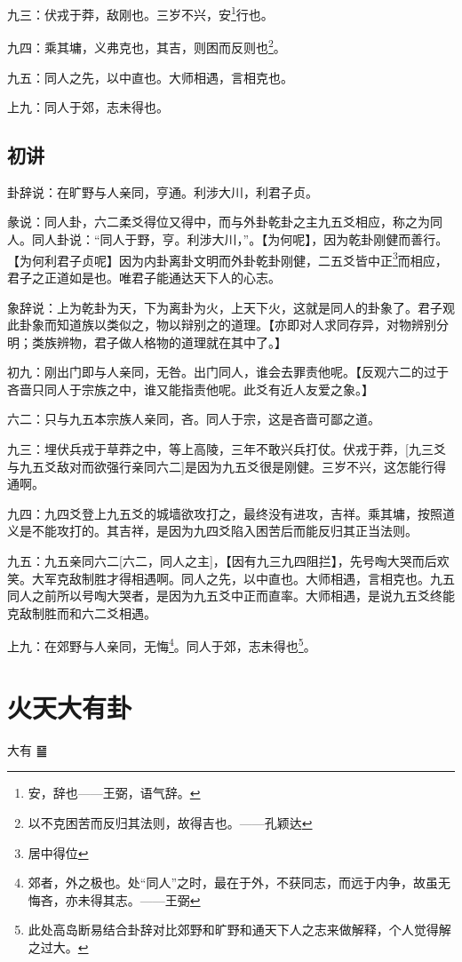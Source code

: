 \documentclass[12pt,oneside]{book}
\begin{document}
九三：伏戎于莽，敌刚也。三岁不兴，安\footnote{安，辞也——王弼，语气辞。}行也。

九四：乘其墉，义弗克也，其吉，则困而反则也\footnote{以不克困苦而反归其法则，故得吉也。——孔颖达}。

九五：同人之先，以中直也。大师相遇，言相克也。

上九：同人于郊，志未得也。

\section{初讲}
卦辞说：在旷野与人亲同，亨通。利涉大川，利君子贞。

彖说：同人卦，六二柔爻得位又得中，而与外卦乾卦之主九五爻相应，称之为同人。同人卦说：“同人于野，亨。利涉大川，”。【为何呢】，因为乾卦刚健而善行。【为何利君子贞呢】因为内卦离卦文明而外卦乾卦刚健，二五爻皆中正\footnote{居中得位}而相应，君子之正道如是也。唯君子能通达天下人的心志。

象辞说：上为乾卦为天，下为离卦为火，上天下火，这就是同人的卦象了。君子观此卦象而知道族以类似之，物以辩别之的道理。【亦即对人求同存异，对物辨别分明；类族辨物，君子做人格物的道理就在其中了。】

初九：刚出门即与人亲同，无咎。出门同人，谁会去罪责他呢。【反观六二的过于吝啬只同人于宗族之中，谁又能指责他呢。此爻有近人友爱之象。】

六二：只与九五本宗族人亲同，吝。同人于宗，这是吝啬可鄙之道。

九三：埋伏兵戎于草莽之中，等上高陵，三年不敢兴兵打仗。伏戎于莽，[九三爻与九五爻敌对而欲强行亲同六二]是因为九五爻很是刚健。三岁不兴，这怎能行得通啊。

九四：九四爻登上九五爻的城墙欲攻打之，最终没有进攻，吉祥。乘其墉，按照道义是不能攻打的。其吉祥，是因为九四爻陷入困苦后而能反归其正当法则。

九五：九五亲同六二[六二，同人之主]，【因有九三九四阻拦】，先号啕大哭而后欢笑。大军克敌制胜才得相遇啊。同人之先，以中直也。大师相遇，言相克也。九五同人之前所以号啕大哭者，是因为九五爻中正而直率。大师相遇，是说九五爻终能克敌制胜而和六二爻相遇。

上九：在郊野与人亲同，无悔\footnote{郊者，外之极也。处“同人”之时，最在于外，不获同志，而远于内争，故虽无悔吝，亦未得其志。——王弼}。同人于郊，志未得也\footnote{此处高岛断易结合卦辞对比郊野和旷野和通天下人之志来做解释，个人觉得解之过大。}。


\chapter{火天大有卦}
大有 {\Large ䷍}
\end{document}
